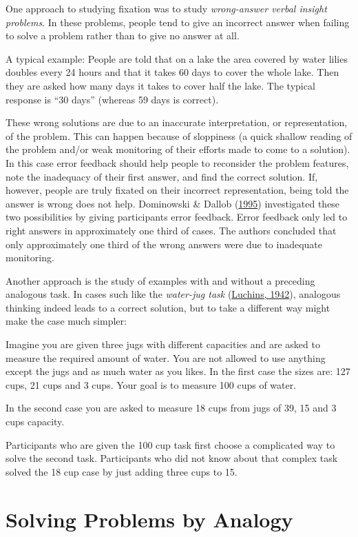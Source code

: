 \documentclass[
]{krantz}
\begin{document}
One approach to studying fixation was to study \emph{wrong-answer verbal insight problems}. In these problems, people tend to give an incorrect answer when failing to solve a problem rather than to give no answer at all.

A typical example: People are told that on a lake the area covered by water lilies doubles every 24 hours and that it takes 60 days to cover the whole lake. Then they are asked how many days it takes to cover half the lake. The typical response is ``30 days'' (whereas 59 days is correct).

These wrong solutions are due to an inaccurate interpretation, or representation, of the problem. This can happen because of sloppiness (a quick shallow reading of the problem and/or weak monitoring of their efforts made to come to a solution). In this case error feedback should help people to reconsider the problem features, note the inadequacy of their first answer, and find the correct solution. If, however, people are truly fixated on their incorrect representation, being told the answer is wrong does not help. Dominowski \& Dallob (\protect\hyperlink{ref-dominowski1995insight}{1995}) investigated these two possibilities by giving participants error feedback. Error feedback only led to right answers in approximately one third of cases. The authors concluded that only approximately one third of the wrong answers were due to inadequate monitoring.

Another approach is the study of examples with and without a preceding analogous task. In cases such like the \emph{water-jug task} (\protect\hyperlink{ref-luchins1942mechanization}{Luchins, 1942}), analogous thinking indeed leads to a correct solution, but to take a different way might make the case much simpler:

Imagine you are given three jugs with different capacities and are asked to measure the required amount of water. You are not allowed to use anything except the jugs and as much water as you likes. In the first case the sizes are: 127 cups, 21 cups and 3 cups. Your goal is to measure 100 cups of water.

In the second case you are asked to measure 18 cups from jugs of 39, 15 and 3 cups capacity.

Participants who are given the 100 cup task first choose a complicated way to solve the second task. Participants who did not know about that complex task solved the 18 cup case by just adding three cups to 15.

\hypertarget{solving-problems-by-analogy}{%
\section{Solving Problems by Analogy}\label{solving-problems-by-analogy}}
\end{document}

